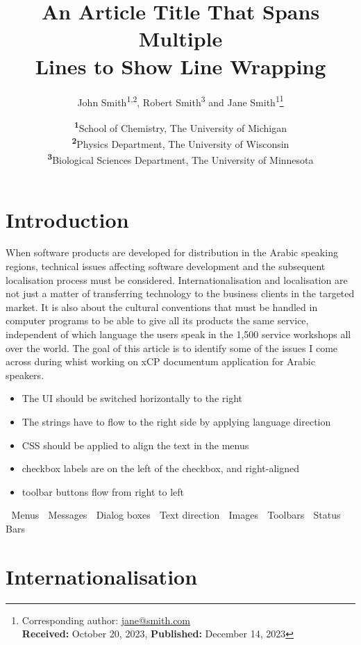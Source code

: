 \documentclass[
	a4paper, %
	10pt, %
	unnumberedsections, %
	twoside, %
]{LTJournalArticle}
\title{An Article Title That Spans Multiple\\ Lines to Show Line Wrapping} %
\author{%
	John Smith\textsuperscript{1,2}, Robert Smith\textsuperscript{3} and Jane Smith\textsuperscript{1}\thanks{Corresponding author: \href{mailto:jane@smith.com}{jane@smith.com}\\ \textbf{Received:} October 20, 2023, \textbf{Published:} December 14, 2023}
}
\date{\footnotesize\textsuperscript{\textbf{1}}School of Chemistry, The University of Michigan\\ \textsuperscript{\textbf{2}}Physics Department, The University of Wisconsin\\ \textsuperscript{\textbf{3}}Biological Sciences Department, The University of Minnesota}
\begin{document}
\maketitle %


\section{Introduction}

When software products are developed for distribution in the Arabic speaking regions, technical issues affecting software development and the subsequent localisation process must be considered. Internationalisation and localisation are not just a matter of transferring technology to the business clients in the targeted market. It is also about the cultural conventions that must be handled in computer programs to be able to give all its products the same service, independent of which language the users speak in the 1,500 service workshops all over the world. The goal of this article is to identify some of the issues I come across during whist working on xCP documentum application for Arabic speakers.

\begin{itemize}
	\item The UI should be switched horizontally to the right
	\item The strings have to flow to the right side by applying language direction
	\item CSS should be applied to align the text in the menus
	\item checkbox labels are on the left of the checkbox, and right-aligned
    \item toolbar buttons flow from right to left
\end{itemize}

	Menus
	Messages
	Dialog boxes
	Text direction
	Images
	Toolbars
	Status Bars

\section{Internationalisation}
\end{document}
